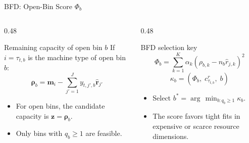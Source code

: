 \documentclass[aspectratio=169,10pt]{beamer}
\begin{document}
\begin{frame}{BFD: Open-Bin Score \texorpdfstring{$\Phi_b$}{Phi}}
  \begin{columns}[T,totalwidth=\textwidth]
    \begin{column}{0.48\textwidth}
      \begin{block}{Remaining capacity of open bin $b$}
        If $i=\tau_{t,b}$ is the machine type of open bin $b$:
        \[
          \boldsymbol{\rho}_b
          =
          \mathbf{m}_i
          -
          \sum_{j'=1}^{J} y_{t,j',b}\hat{\mathbf{r}}_{j'}
        \]
      \end{block}
      \begin{itemize}
        \item For open bins, the candidate capacity is $\mathbf{z}=\boldsymbol{\rho}_b$.
        \item Only bins with $q_b\geq 1$ are feasible.
      \end{itemize}
    \end{column}
    \begin{column}{0.48\textwidth}
      \begin{block}{BFD selection key}
        \[
          \Phi_b
          =
          \sum_{k=1}^{K}
          \alpha_k
          \left(\rho_{b,k}-n_b\hat{r}_{j,k}\right)^2
        \]
        \[
          \kappa_b =
          \left(\Phi_b,\;c^r_{\tau_{t,b}},\;b\right)
        \]
      \end{block}
      \begin{itemize}
        \item Select $b^*=\arg\,\min_{b:q_b\geq 1}\kappa_b$.
        \item The score favors tight fits in expensive or scarce resource dimensions.
      \end{itemize}
    \end{column}
  \end{columns}
\end{frame}
\end{document}
